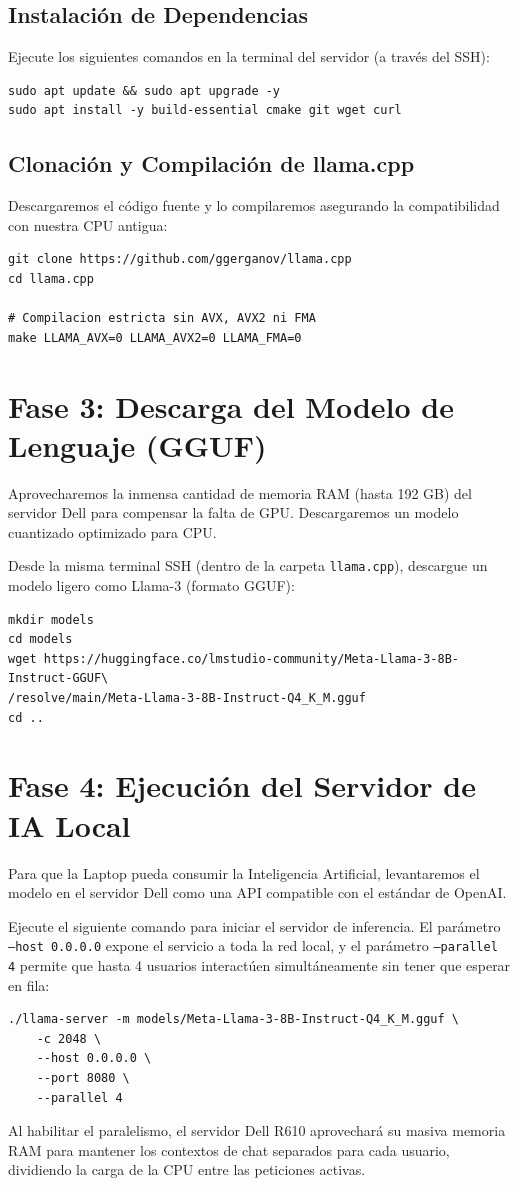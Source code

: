 \documentclass[12pt,a4paper]{article}
\begin{document}
\subsection{Instalación de Dependencias}
Ejecute los siguientes comandos en la terminal del servidor (a través del SSH):
\begin{verbatim}
sudo apt update && sudo apt upgrade -y
sudo apt install -y build-essential cmake git wget curl
\end{verbatim}

\subsection{Clonación y Compilación de llama.cpp}
Descargaremos el código fuente y lo compilaremos asegurando la compatibilidad con nuestra CPU antigua:
\begin{verbatim}
git clone https://github.com/ggerganov/llama.cpp
cd llama.cpp

# Compilacion estricta sin AVX, AVX2 ni FMA
make LLAMA_AVX=0 LLAMA_AVX2=0 LLAMA_FMA=0
\end{verbatim}

\section{Fase 3: Descarga del Modelo de Lenguaje (GGUF)}
Aprovecharemos la inmensa cantidad de memoria RAM (hasta 192 GB) del servidor Dell para compensar la falta de GPU. Descargaremos un modelo cuantizado optimizado para CPU.

Desde la misma terminal SSH (dentro de la carpeta \texttt{llama.cpp}), descargue un modelo ligero como Llama-3 (formato GGUF):
\begin{verbatim}
mkdir models
cd models
wget https://huggingface.co/lmstudio-community/Meta-Llama-3-8B-Instruct-GGUF\
/resolve/main/Meta-Llama-3-8B-Instruct-Q4_K_M.gguf
cd ..
\end{verbatim}

\section{Fase 4: Ejecución del Servidor de IA Local}
Para que la Laptop pueda consumir la Inteligencia Artificial, levantaremos el modelo en el servidor Dell como una API compatible con el estándar de OpenAI.

Ejecute el siguiente comando para iniciar el servidor de inferencia. El parámetro \texttt{--host 0.0.0.0} expone el servicio a toda la red local, y el parámetro \texttt{--parallel 4} permite que hasta 4 usuarios interactúen simultáneamente sin tener que esperar en fila:
\begin{verbatim}
./llama-server -m models/Meta-Llama-3-8B-Instruct-Q4_K_M.gguf \
    -c 2048 \
    --host 0.0.0.0 \
    --port 8080 \
    --parallel 4
\end{verbatim}
Al habilitar el paralelismo, el servidor Dell R610 aprovechará su masiva memoria RAM para mantener los contextos de chat separados para cada usuario, dividiendo la carga de la CPU entre las peticiones activas.
\end{document}
